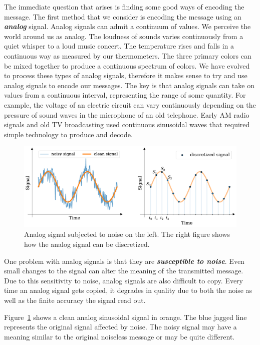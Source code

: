 The immediate question that arises is finding some good ways of encoding the message.
The first method that we consider is encoding the message using an \textit{\textbf{analog}} signal.
Analog signals can admit a continuum of values.
We perceive the world around us as analog.
The loudness of sounds varies continuously from a quiet whisper to a loud music concert.
The temperature rises and falls in a continuous way as measured by our thermometers.
The three primary colors can be mixed together to produce a continuous spectrum of colors.
We have evolved to process these types of analog signals, therefore it makes sense to try and use analog signals to encode our messages.
The key is that analog signals can take on values from a continuous interval, representing the range of some quantity.
For example, the voltage of an electric circuit can vary continuously depending on the pressure of sound waves in the microphone of an old telephone.
Early AM radio signals and old TV broadcasting used continuous sinusoidal waves that required simple technology to produce and decode.

\begin{figure}[t]
    \centering
    \includegraphics[width=\textwidth]{lesson1/1-2_signals.pdf}
    \caption[Continuous and discrete signals]{Analog signal subjected to noise on the left. The right figure shows how the analog signal can be discretized.}
    \label{fig:1-2_signals}
\end{figure}

One problem with analog signals is that they are \textit{\textbf{susceptible to noise}}.
Even small changes to the signal can alter the meaning of the transmitted message.
Due to this sensitivity to noise, analog signals are also difficult to copy.
Every time an analog signal gets copied, it degrades in quality due to both the noise as well as the finite accuracy the signal read out.

Figure~\ref{fig:1-2_signals} shows a clean analog sinusoidal signal in orange.
The blue jagged line represents the original signal affected by noise.
The noisy signal may have a meaning similar to the original noiseless message or may be quite different.

